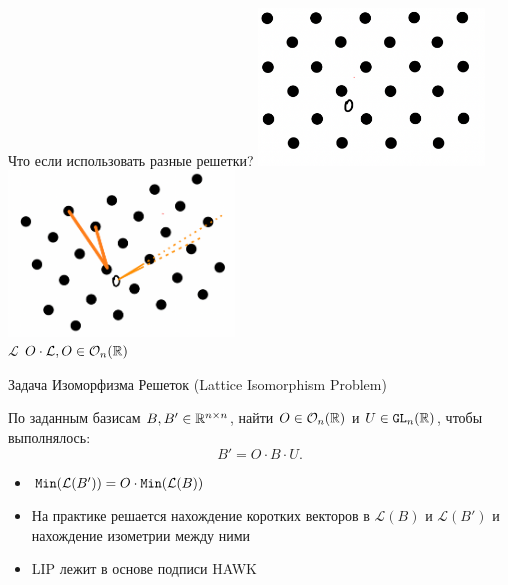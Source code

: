 \documentclass[usenames,dvipsnames, 9pt]{beamer}
\begin{document}
{
	\begin{frame}{Что если использовать разные решетки?}
		\includegraphics[width=0.45\textwidth]{goodbasis4}%
		\hspace{20pt}
		\includegraphics[width=0.45\textwidth]{badbasis4} \\[10pt]
		\Large
		\centering
		$\mathcal{L}$ \hspace{150pt} $O\cdot \mathcal{L}, O \in \mathcal{O}_n({{\mathbb R}})$
		
	\end{frame}
}

{
\begin{frame}{Задача Изоморфизма Решеток (Lattice Isomorphism Problem)}
	\Large 
	
	По заданным базисам $B, B' \in {{\mathbb R}}^{n\times n}$, найти $O \in \mathcal{O}_n({{\mathbb R}})$ и $U \in \mathtt{GL}_n({{\mathbb R}})$, чтобы выполнялось:
	\[
		B' = O \cdot B \cdot U. 
	\]
	
	\begin{itemize}
		\item $\mathtt{Min}(\mathcal{L}(B')) = O \cdot \mathtt{Min}(\mathcal{L}(B)) $
		\item На практике решается нахождение коротких векторов в $\mathcal{L}(B)$ и $\mathcal{L}(B')$ и нахождение изометрии между ними
		\item LIP лежит в основе подписи HAWK
	\end{itemize}
	
\end{frame}
}
\end{document}
